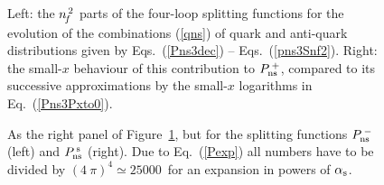 \documentclass[12pt]{article}
\newcommand{\als}{\alpha_{\rm s}}
\begin{document}
\begin{figure}[p]
\vspace{-4mm}
\centerline{}
\vspace{-2mm}
\caption{ \label{fig:pns1} \small
 Left: the ${n^{\,2}_{\! f}}$ parts of the four-loop splitting functions for the evolution 
 of the combinations (\ref{qns}) of quark and anti-quark distributions given by
 Eqs.~(\ref{Pns3dec}) -- Eqs.~(\ref{pns3Snf2}).
 Right: the small-$x$ behaviour of this contribution to $P_{\rm ns}^{\:+}$,
 compared to its successive approximations by the small-$x$ logarithms in 
 Eq.~(\ref{Pns3Pxto0}).}
\vspace{-1mm}
\end{figure}
%
\begin{figure}[p]
\vspace{-2mm}
\centerline{}
\vspace{-2mm}
\caption{ \label{fig:pns2} \small
 As the right panel of Figure~\ref{fig:pns1}, but for the splitting functions
 $P_{\rm ns}^{\:-}$ (left) and $P_{\rm ns}^{\:\rm s}$ (right). 
 Due to Eq.~(\ref{Pexp}) all numbers have to be divided by $(4\:\! \pi)^4 
 \simeq 25000\,$ for an expansion in powers of $\als$.} 
\vspace{-1mm}
\end{figure}

\pagebreak
\end{document}
